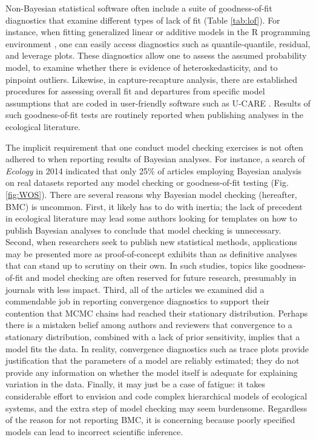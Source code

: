 \documentclass[12pt,english]{article}
\begin{document}
\begin{spacing}{1.9}
Non-Bayesian statistical software often include a suite of
goodness-of-fit diagnostics that examine different types of lack of
fit (Table \ref{tab:lof}).  For instance, when fitting generalized
linear \citep{McCullaghNelder1989} or additive \citep{Wood2006} models
in the R programming environment \citep{RTeam2017}, one can easily
access diagnostics such as quantile-quantile, residual, and leverage
plots.  These diagnostics allow one to assess the assumed probability
model, to examine whether there is evidence of heteroskedasticity, and
to pinpoint outliers.  Likewise, in capture-recapture analysis, there
are established procedures for assessing overall fit and departures
from specific model assumptions that are coded in user-friendly
software such as U-CARE \citep{ChoquetEtAl2009}.  Results of such
goodness-of-fit tests are routinely reported when publishing analyses
in the ecological literature.

The implicit requirement that one conduct model checking exercises is
not often adhered to when reporting results of Bayesian analyses.  For
instance, a search of \textit{Ecology} in 2014 indicated that only
25\% of articles employing Bayesian analysis on real datasets reported
any model checking or goodness-of-fit testing (Fig. \ref{fig:WOS}).
There are several reasons why Bayesian model checking (hereafter, BMC)
is uncommon.  First, it likely has to do with inertia; the lack of
precedent in ecological literature may lead some authors looking for
templates on how to publish Bayesian analyses to conclude that model
checking is unnecessary.  Second, when researchers seek to publish new
statistical methods, applications may be presented more as
proof-of-concept exhibits than as definitive analyses that can stand
up to scrutiny on their own. In such studies, topics like
goodness-of-fit and model checking are often reserved for future
research, presumably in journals with less impact.  Third, all of the
articles we examined did a commendable job in reporting convergence
diagnostics to support their contention that MCMC chains had reached
their stationary distribution.  Perhaps there is a mistaken belief
among authors and reviewers that convergence to a stationary
distribution, combined with a lack of prior sensitivity, implies that
a model fits the data.  In reality, convergence diagnostics such as trace plots provide justification that the parameters of a model are reliably estimated; they do not
provide any information on whether the model itself is adequate for explaining variation in the data. Finally, it may just be a case of fatigue: it
takes considerable effort to envision and code complex hierarchical
models of ecological systems, and the extra step of model checking may
seem burdensome.  Regardless of the reason for not reporting BMC, it is
concerning because poorly specified models can lead to incorrect scientific inference.


\end{spacing}
\end{document}
